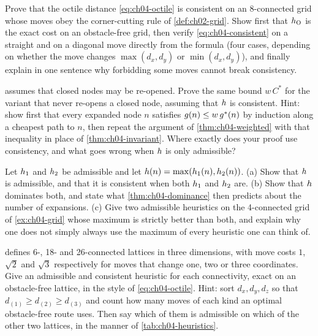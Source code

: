 \begin{exercise}[\difficulty{2}]
\label{exr:ch04-octile}
Prove that the octile distance \cref{eq:ch04-octile} is consistent on an
8-connected grid whose moves obey the corner-cutting rule of
\cref{def:ch02-grid}. Show first that $h_{\mathrm{O}}$ is the exact cost on
an obstacle-free grid, then verify \cref{eq:ch04-consistent} on a straight and
on a diagonal move directly from the formula (four cases, depending on whether
the move changes $\max(d_x,d_y)$ or $\min(d_x,d_y)$), and finally explain in one
sentence why forbidding some moves cannot break consistency.
\end{exercise}

\begin{exercise}[\difficulty{2}]
\label{exr:ch04-wbound}
 assumes that closed nodes may be re-opened. Prove the
same bound $w\,C^*$ for the variant that never re-opens a closed node, assuming
that $h$ is consistent. Hint: show first that every expanded node $n$
satisfies $g(n) \le w\,g^*(n)$ by induction along a cheapest path to
$n$, then repeat the argument of \cref{thm:ch04-weighted} with that inequality
in place of \cref{thm:ch04-invariant}. Where exactly does your proof use
consistency, and what goes wrong when $h$ is only admissible?
\end{exercise}

\begin{exercise}[\difficulty{2}]
\label{exr:ch04-max}
Let $h_1$ and $h_2$ be admissible and let $h(n) =
\max(h_1(n), h_2(n))$. (a) Show that $h$ is admissible, and that
it is consistent when both $h_1$ and $h_2$ are. (b) Show that
$h$ dominates both, and state what \cref{thm:ch04-dominance} then predicts
about the number of expansions. (c) Give two admissible heuristics on the
4-connected grid of \cref{ex:ch04-grid} whose maximum is strictly better than
both, and explain why one does not simply always use the maximum of every
heuristic one can think of.
\end{exercise}

\begin{exercise}[\difficulty{2}]
\label{exr:ch04-lattice}
 defines 6-, 18- and 26-connected lattices in three dimensions,
with move costs $1$, $\sqrt{2}$ and $\sqrt{3}$ respectively for moves that
change one, two or three coordinates. Give an admissible and consistent
heuristic for each connectivity, exact on an obstacle-free lattice, in the style
of \cref{eq:ch04-octile}. Hint: sort $d_x, d_y, d_z$ so that $d_{(1)} \ge
d_{(2)} \ge d_{(3)}$ and count how many moves of each kind an optimal
obstacle-free route uses. Then say which of them is admissible on which of the
other two lattices, in the manner of \cref{tab:ch04-heuristics}.
\end{exercise}

